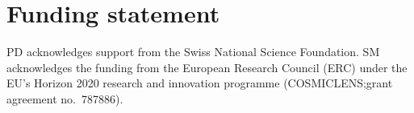 







% 
\section*{Funding statement}
PD acknowledges support from the Swiss National Science Foundation.
SM acknowledges the funding from the European Research Council (ERC)
under the EU’s Horizon 2020 research and innovation programme
(COSMICLENS;\@ grant agreement no.~787886).

% 
%


